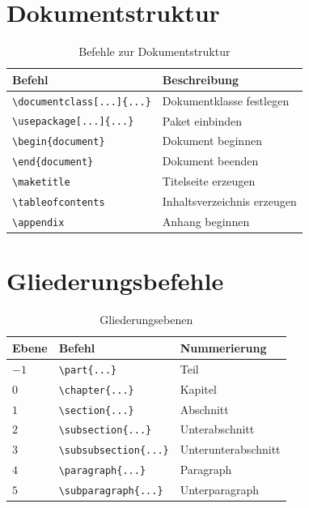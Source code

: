 \section{Dokumentstruktur}

\begin{table}[htbp]
    \centering
    \caption{Befehle zur Dokumentstruktur}
    \label{tab:befehle-struktur}
    \begin{tabular}{lp{7cm}}
        \toprule
        Befehl & Beschreibung \\
        \midrule
        \texttt{\textbackslash documentclass[...]\{...\}} & Dokumentklasse festlegen \\
        \texttt{\textbackslash usepackage[...]\{...\}} & Paket einbinden \\
        \texttt{\textbackslash begin\{document\}} & Dokument beginnen \\
        \texttt{\textbackslash end\{document\}} & Dokument beenden \\
        \texttt{\textbackslash maketitle} & Titelseite erzeugen \\
        \texttt{\textbackslash tableofcontents} & Inhaltsverzeichnis erzeugen \\
        \texttt{\textbackslash appendix} & Anhang beginnen \\
        \bottomrule
    \end{tabular}
\end{table}

\section{Gliederungsbefehle}

\begin{table}[htbp]
    \centering
    \caption{Gliederungsebenen}
    \label{tab:befehle-gliederung}
    \begin{tabular}{lll}
        \toprule
        Ebene & Befehl & Nummerierung \\
        \midrule
        $-1$ & \texttt{\textbackslash part\{...\}} & Teil \\
        $0$  & \texttt{\textbackslash chapter\{...\}} & Kapitel \\
        $1$  & \texttt{\textbackslash section\{...\}} & Abschnitt \\
        $2$  & \texttt{\textbackslash subsection\{...\}} & Unterabschnitt \\
        $3$  & \texttt{\textbackslash subsubsection\{...\}} & Unterunterabschnitt \\
        $4$  & \texttt{\textbackslash paragraph\{...\}} & Paragraph \\
        $5$  & \texttt{\textbackslash subparagraph\{...\}} & Unterparagraph \\
        \bottomrule
    \end{tabular}
\end{table}

